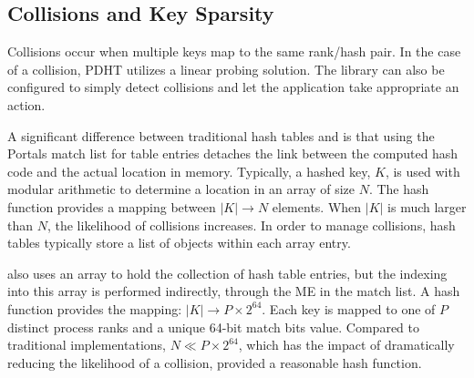 \subsection{Collisions and Key Sparsity}

Collisions occur when multiple keys map to the same rank/hash pair.
In the case of a collision,
PDHT utilizes a linear probing solution. The library can
also be configured to simply detect collisions and let the application
take appropriate an action. 

A significant difference between traditional hash tables and \pdht is
that using the Portals match list for table entries detaches the link
between the computed hash code and the actual location in
memory. Typically, a hashed key, $K$,  is used with modular arithmetic to
determine a location in an array of size $N$. The hash function
provides a mapping between $|K| \rightarrow N$ elements. When $|K|$ is
much larger than $N$, the likelihood of collisions increases. In order
to manage collisions, hash tables typically store a list of objects within
each array entry.
% 
%
%

\pdht also uses an array to hold the collection of hash table
entries, but the indexing into this array is performed indirectly,
through the ME in the match list. A \pdht hash function provides the 
mapping: $|K| \rightarrow P \times 2^{64}$. Each key is mapped to one
of $P$ distinct process ranks and a unique 64-bit match bits
value. Compared to traditional implementations, $N \ll  P \times
2^{64}$, which has the impact of dramatically reducing the likelihood
of a collision, provided a reasonable hash function.


